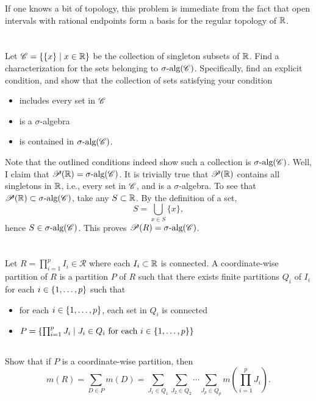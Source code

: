 \documentclass[12pt]{article}
\begin{document}
If one knows a bit of topology, this problem is immediate from the fact that open intervals with rational endpoints form a basis for the regular topology of $\mathbb{R}$. 

\section{}
Let $\mathscr{C} = \{\{x\} \mid x \in \mathbb{R}\}$ be the collection of singleton subsets of $\mathbb{R}$. 
Find a characterization for the sets belonging to $\sigma\text{-alg}(\mathscr{C})$. 
Specifically, find an explicit condition, and show that the collection of sets satisfying your condition 
\begin{itemize} 
  \item includes every set in $\mathscr{C}$
  \item is a $\sigma$-algebra 
  \item is contained in $\sigma\text{-alg}(\mathscr{C})$. 
\end{itemize} 

\noindent\dotfill 

Note that the outlined conditions indeed show such a collection is $\sigma\text{-alg}(\mathscr{C})$. 
Well, I claim that $\mathscr{P}(\mathbb{R}) = \sigma\text{-alg}(\mathscr{C})$. 
It is trivially true that $\mathscr{P}(\mathbb{R})$ contains all singletons in $\mathbb{R}$, i.e., every set in $\mathscr{C}$, and is a $\sigma$-algebra. 
To see that $\mathscr{P}(\mathbb{R}) \subset \sigma\text{-alg}(\mathscr{C})$, take any $S \subset \mathbb{R}$. 
By the definition of a set, 
$$S = \bigcup_{x \in S} \{x\},$$
hence $S \in \sigma\text{-alg}(\mathscr{C})$. 
This proves $\mathscr{P}(R) = \sigma\text{-alg}(\mathscr{C})$. 

\section{} 
Let $R = \prod_{i = 1}^{p} I_i \in \mathcal{R}$ where each $I_i \subset \mathbb{R}$ is connected. 
A coordinate-wise partition of $R$ is a partition $P$ of $R$ such that there exists finite partitions $Q_i$ of $I_i$ for each $i \in \{1, \ldots, p\}$ such that 
\begin{itemize}
  \item for each $i \in \{1, \ldots, p\}$, each set in $Q_i$ is connected 
  \item $P = \{\prod_{i = 1}^{p} J_i \mid J_i \in Q_i \text{ for each } i \in \{1, \ldots, p\}\}$ 
\end{itemize}

\subsection{} 
Show that if $P$ is a coordinate-wise partition, then 
\begin{equation} \label{eq:5_a_wts}
m(R) = \sum_{D \in P} m(D) = \sum_{J_1 \in Q_1} \sum_{J_2 \in Q_2} \cdots \sum_{J_p \in Q_p} m(\prod_{i = 1}^{p} J_i).
\end{equation}
\end{document}
